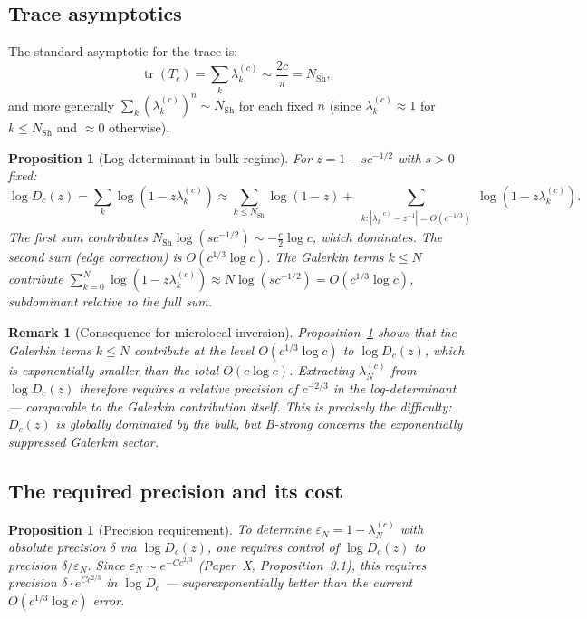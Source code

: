 \documentclass[12pt,a4paper]{article}
\newtheorem{proposition}[theorem]{Proposition}
\newtheorem{remark}[theorem]{Remark}
\newcommand{\lam}[1]{\lambda_{#1}^{(c)}}
\newcommand{\Tc}{T_c}
\newcommand{\Dc}{D_c}
\begin{document}
\subsection{Trace asymptotics}

The standard asymptotic for the trace is:
\[
  \operatorname{tr}(\Tc) = \sum_k \lam{k}
  \sim \frac{2c}{\pi}
  = N_{\mathrm{Sh}},
\]
and more generally
$\sum_k (\lam{k})^n \sim N_{\mathrm{Sh}}$
for each fixed $n$ (since $\lam{k} \approx 1$
for $k \leq N_{\mathrm{Sh}}$ and $\approx 0$ otherwise).

\begin{proposition}[Log-determinant in bulk regime]
\label{prop:logdet}
For $z = 1 - sc^{-1/2}$ with $s > 0$ fixed:
\[
  \log \Dc(z)
  = \sum_k \log(1 - z\lam{k})
  \approx \sum_{k \leq N_{\mathrm{Sh}}} \log(1 - z)
  + \sum_{\substack{k : |\lam{k} - z^{-1}| = O(c^{-1/3})}}
  \log(1 - z\lam{k}).
\]
The first sum contributes
$N_{\mathrm{Sh}} \log(sc^{-1/2}) \sim -\frac{c}{2}\log c$,
which dominates.
The second sum (edge correction) is $O(c^{1/3}\log c)$.
The Galerkin terms $k \leq N$ contribute
$\sum_{k=0}^N \log(1 - z\lam{k})
\approx N \log(sc^{-1/2})
= O(c^{1/3}\log c)$,
subdominant relative to the full sum.
\end{proposition}

\begin{remark}[Consequence for microlocal inversion]
Proposition~\ref{prop:logdet} shows that the Galerkin
terms $k \leq N$ contribute at the level
$O(c^{1/3}\log c)$ to $\log \Dc(z)$,
which is exponentially smaller than the total
$O(c \log c)$.
Extracting $\lam{N}$ from $\log \Dc(z)$ therefore
requires a relative precision of $c^{-2/3}$ in
the log-determinant --- comparable to the Galerkin
contribution itself.
This is precisely the difficulty:
$\Dc(z)$ is globally dominated by the bulk,
but B-strong concerns the exponentially suppressed
Galerkin sector.
\end{remark}

\subsection{The required precision and its cost}

\begin{proposition}[Precision requirement]
\label{prop:precision}
To determine $\varepsilon_N = 1 - \lam{N}$
with absolute precision $\delta$ via
$\log \Dc(z)$, one requires control of
$\log \Dc(z)$ to precision $\delta/\varepsilon_N$.
Since $\varepsilon_N \sim e^{-Cc^{2/3}}$
(Paper~X, Proposition~3.1),
this requires precision $\delta \cdot e^{Cc^{2/3}}$
in $\log \Dc$ --- superexponentially better
than the current $O(c^{1/3} \log c)$ error.
\end{proposition}
\end{document}
